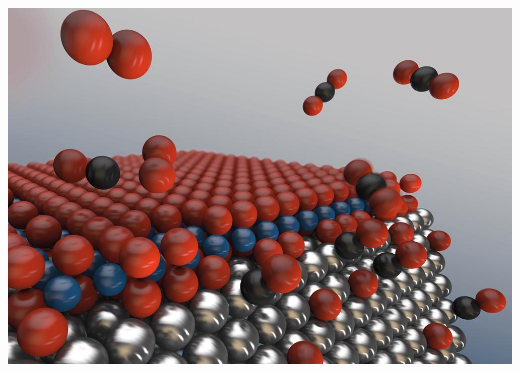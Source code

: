 \documentclass[10pt,t]{beamer}
\begin{document}
\begin{frame}
\begin{columns}
        \includegraphics[width=\textwidth]{nano-3d}
\end{columns}
\end{frame}
\end{document}
